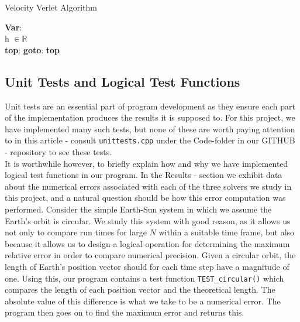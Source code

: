 		\begin{algorithm}[H]
		\caption{Velocity Verlet Algorithm}
		\label{algoVV}
		\SetAlgoLined
		
		\textbf{Var}:\\
		h $\in \mathbb{R}$\\
		\textbf{top}:	
		\newline
	\textbf{goto}: \textbf{top}
	\end{algorithm}
	
	\subsection{Unit Tests and Logical Test Functions}\label{tests}
	Unit tests are an essential part of program development as they ensure each part of the implementation produces the results it is supposed to. For this project, we have implemented many such tests, but none of these are worth paying attention to in this article - consult \texttt{unittests.cpp} under the Code-folder in our GITHUB - repository to see these tests. \\
	
	It is worthwhile however, to briefly explain how and why we have implemented logical test functions in our program. In the Results - section we exhibit data about the numerical errors associated with each of the three solvers we study in this project, and a natural question should be how this error computation was performed. Consider the simple Earth-Sun system in which we assume the Earth's orbit is circular. We study this system with good reason, as it allows us not only to compare run times for large $N$ within a suitable time frame, but also because it allows us to design a logical operation for determining the maximum relative error in order to compare numerical precision. Given a circular orbit, the length of Earth's position vector should for each time step have a magnitude of one. Using this, our program contains a test function \texttt{TEST\_circular()} which compares the length of each position vector and the theoretical length. The absolute value of this difference is what we take to be a numerical error. The program then goes on to find the maximum error and returns this.\\
	

